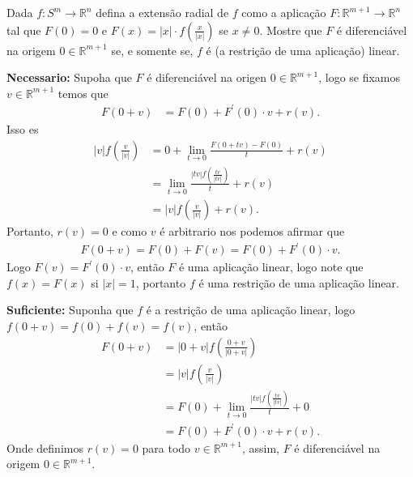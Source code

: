 \begin{homeworkProblem}[Seção 1-7]
  Dada $f : S^m \to \mathbb{R}^n$ defina a extensão radial de $f$ como a aplicação $F : \mathbb{R}^{m+1} \to \mathbb{R}^n$ tal que $F(0)=0$ e $F(x) = |x|\cdot f\left(\frac{x}{|x|}\right)$ se $x \neq 0$. Mostre que $F$ é diferenciável na origem $0 \in \mathbb{R}^{m+1}$ se, e somente se, $f$ é (a restrição de uma aplicação) linear.
  \begin{solution}
    \textbf{Necessario:} Supoha que $F$ é diferenciável na origen $0\in\mathbb{R}^{m+1}$, logo se fixamos $v\in\mathbb{R}^{m+1}$ temos que 
    \begin{align*}
      F(0+v)&=F(0)+F^{\prime}(0)\cdot v+r(v).
    \end{align*}
    Isso es
    \begin{align*}
      |v|f\left( \frac{v}{|v|} \right)&=0+\lim_{t \to 0}\frac{F(0+tv)-F(0)}{t}+r(v)\\
      &=\lim_{t \to 0}\frac{|tv|f\left( \frac{tv}{|tv|} \right)}{t}+r(v)\\
      &=|v|f\left( \frac{v}{|v|} \right)+r(v).
    \end{align*}
    Portanto, $r(v)=0$ e como $v$ é arbitrario nos podemos afirmar que
    \begin{align*}
      F(0+v)=F(0)+F(v)=F(0)+F^{\prime}(0)\cdot v.
    \end{align*}
    Logo $F(v)=F^{\prime}(0)\cdot v$, então $F$ é uma aplicação linear, logo note que $f(x)=F(x)$ si $|x|=1$, portanto $f$ é uma restrição de uma aplicação linear.

    \textbf{Suficiente:} Suponha que $f$ é a restrição de uma aplicação linear, logo $f(0+v)=f(0)+f(v)=f(v)$, então
    \begin{align*}
      F(0+v)&=|0+v|f\left( \frac{0+v}{|0+v|} \right)\\
      &=|v|f\left( \frac{v}{|v|} \right)\\
      &=F(0)+\lim_{t \to 0}\frac{|tv|f\left( \frac{tv}{|tv|} \right)}{t}+0\\
      &=F(0)+F^{\prime}(0)\cdot v+r(v).
    \end{align*}
    Onde definimos $r(v)=0$ para todo $v\in\mathbb{R}^{m+1}$, assim, $F$ é diferenciável na origem $0\in\mathbb{R}^{m+1}$. 
  \end{solution}
\end{homeworkProblem}
